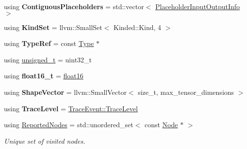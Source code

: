 \begin{DoxyCompactItemize}
\item 
\mbox{\label{namespaceglow_ab1c5bff83b098172f4dd1c9ba869e353}} 
using {\bfseries Contiguous\+Placeholders} = std\+::vector$<$ \hyperlink{structglow_1_1_placeholder_input_output_info}{Placeholder\+Input\+Output\+Info} $>$
\item 
\mbox{\label{namespaceglow_a5ffc97cbc6f11ac585d36ce9b4bdd524}} 
using {\bfseries Kind\+Set} = llvm\+::\+Small\+Set$<$ Kinded\+::\+Kind, 4 $>$
\item 
\mbox{\label{namespaceglow_a9c621decc80700e6f5197522c3a710b6}} 
using {\bfseries Type\+Ref} = const \hyperlink{structglow_1_1_type}{Type} $\ast$
\item 
using \hyperlink{namespaceglow_a0ca574644e1e42ef193a9947fb4d8911}{unsigned\+\_\+t} = uint32\+\_\+t
\item 
\mbox{\label{namespaceglow_a21d2b7b208b08479f97d30186bcaac1e}} 
using {\bfseries float16\+\_\+t} = \hyperlink{classglow_1_1float16}{float16}
\item 
\mbox{\label{namespaceglow_af9a8882a5c68517141911de7bf6662e6}} 
using {\bfseries Shape\+Vector} = llvm\+::\+Small\+Vector$<$ size\+\_\+t, max\+\_\+tensor\+\_\+dimensions $>$
\item 
\mbox{\label{namespaceglow_ac9d940b6582e442881018a0abfae6a17}} 
using {\bfseries Trace\+Level} = \hyperlink{structglow_1_1_trace_event_a10132a384d74408a112510cbe1b7d978}{Trace\+Event\+::\+Trace\+Level}
\item 
\mbox{\label{namespaceglow_a5ff2abbc85bc7a268f9927afc6ee607f}} 
using \hyperlink{namespaceglow_a5ff2abbc85bc7a268f9927afc6ee607f}{Reported\+Nodes} = std\+::unordered\+\_\+set$<$ const \hyperlink{classglow_1_1_node}{Node} $\ast$ $>$
\begin{DoxyCompactList}\small\item\em Unique set of visited nodes. \end{DoxyCompactList}\item 
\mbox{\label{namespaceglow_a4128b6e54c614a0a53265ffdce7073db}} 

\end{DoxyCompactItemize}
